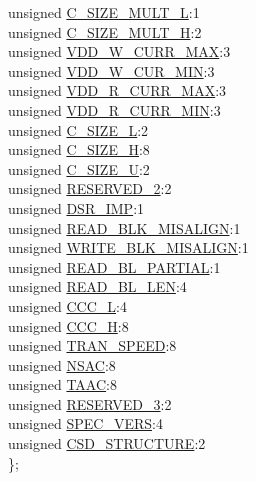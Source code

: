 \begin{DoxyCompactItemize}
\begin{tabbing}
\>unsigned \hyperlink{union_c_s_d_a841b6664604cbddaa3e2c6cb546e1f65}{C\_SIZE\_MULT\_L}:1\\
\>unsigned \hyperlink{union_c_s_d_ac06802d8fba35033a3169554494ac092}{C\_SIZE\_MULT\_H}:2\\
\>unsigned \hyperlink{union_c_s_d_a7f2e270517fb1eac386c5c030342230f}{VDD\_W\_CURR\_MAX}:3\\
\>unsigned \hyperlink{union_c_s_d_a53ecaaa768f15c975cb5da5938714fa2}{VDD\_W\_CUR\_MIN}:3\\
\>unsigned \hyperlink{union_c_s_d_a526a68e4eb7dea25a4d0955580b01fd3}{VDD\_R\_CURR\_MAX}:3\\
\>unsigned \hyperlink{union_c_s_d_aa7b5df9b4b08525c540d1f18762064d6}{VDD\_R\_CURR\_MIN}:3\\
\>unsigned \hyperlink{union_c_s_d_a0cb7be7cd4bafa8bb1e475bf51c4c9e0}{C\_SIZE\_L}:2\\
\>unsigned \hyperlink{union_c_s_d_ac817866417814f12dc2543928e8e7c33}{C\_SIZE\_H}:8\\
\>unsigned \hyperlink{union_c_s_d_a0be4de569ebdbb2547387d345b98eb15}{C\_SIZE\_U}:2\\
\>unsigned \hyperlink{union_c_s_d_a0355b4ff187083c03ad04186cb91f7f4}{RESERVED\_2}:2\\
\>unsigned \hyperlink{union_c_s_d_abde3a61cda4e6462f326c229e5e41cb4}{DSR\_IMP}:1\\
\>unsigned \hyperlink{union_c_s_d_a89910eec988a2ad957d8027dc5cd55f3}{READ\_BLK\_MISALIGN}:1\\
\>unsigned \hyperlink{union_c_s_d_a388e50ae80756e0a2bc1d64555da71ab}{WRITE\_BLK\_MISALIGN}:1\\
\>unsigned \hyperlink{union_c_s_d_aab933cb97ec6db2a716f43f8b7d4d1a4}{READ\_BL\_PARTIAL}:1\\
\>unsigned \hyperlink{union_c_s_d_a51734dc42fcdda366768735e57044f42}{READ\_BL\_LEN}:4\\
\>unsigned \hyperlink{union_c_s_d_a2f0b3bbc97ca147c996fdfddc22b3101}{CCC\_L}:4\\
\>unsigned \hyperlink{union_c_s_d_ac354cfa2e9734511649b435bc56a69a7}{CCC\_H}:8\\
\>unsigned \hyperlink{union_c_s_d_a59f2af55101b38c975a798fa0b35ed3f}{TRAN\_SPEED}:8\\
\>unsigned \hyperlink{union_c_s_d_af4c16d2a19232aafe25a5fa6935cf1db}{NSAC}:8\\
\>unsigned \hyperlink{union_c_s_d_a5b0c9f3af14c08ef04c368b5e5325b85}{TAAC}:8\\
\>unsigned \hyperlink{union_c_s_d_aa1e2217b56977c022f83f82dda831d5f}{RESERVED\_3}:2\\
\>unsigned \hyperlink{union_c_s_d_a696138d4cf945062a409e5271699d319}{SPEC\_VERS}:4\\
\>unsigned \hyperlink{union_c_s_d_a78f3c2b6b7cc51cf8ecf0a68051dd7e1}{CSD\_STRUCTURE}:2\\
\}; \\

\end{tabbing}\end{DoxyCompactItemize}



